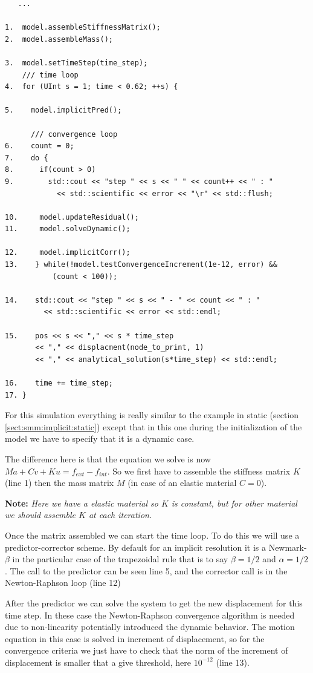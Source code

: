 \documentclass[a4paper,11pt]{book}
\newcommand{\note}[1]{\textbf{Note: }\textit{#1}}
\begin{document}
\begin{verbatim}
   ...

1.  model.assembleStiffnessMatrix();
2.  model.assembleMass();

3.  model.setTimeStep(time_step);
    /// time loop
4.  for (UInt s = 1; time < 0.62; ++s) {

5.    model.implicitPred();

      /// convergence loop
6.    count = 0;
7.    do {
8.      if(count > 0)
9.        std::cout << "step " << s << " " << count++ << " : "
		    << std::scientific << error << "\r" << std::flush;

10.     model.updateResidual();
11.     model.solveDynamic();

12.     model.implicitCorr();
13.    } while(!model.testConvergenceIncrement(1e-12, error) &&
	       (count < 100));

14.    std::cout << "step " << s << " - " << count << " : "
		 << std::scientific << error << std::endl;

15.    pos << s << "," << s * time_step
	   << "," << displacment(node_to_print, 1)
	   << "," << analytical_solution(s*time_step) << std::endl;

16.    time += time_step;
17. }
\end{verbatim}

For  this simulation  everything  is really  similar  to the  example in  static
(section  \ref{sect:smm:implicit:static}) except  that  in this  one during  the
initialization of the model we have to specify that it is a dynamic case.

The difference here is that the equation we solve is now $Ma + Cv + Ku = f_{ext}
- f_{int}$. So we first have to  assemble the stiffness matrix $K$ (line 1) then
the mass matrix $M$ (in case of an elastic material $C = 0$).

\note{Here we have a elastic material so $K$ is constant, but for other material
  we should assemble $K$ at each iteration.}

Once the matrix assembled  we can start the time loop. To do  this we will use a
predictor-corrector  scheme. By  default  for  an implicit  resolution  it is  a
Newmark-$\beta$ in  the particular case of  the trapezoidal rule that  is to say
$\beta = 1/2$ and $\alpha = 1/2$.  The call to the predictor can be seen line 5,
and the corrector call is in the Newton-Raphson loop (line 12)

After the predictor we can solve the system to get the new displacement for this
time step. In these case  the Newton-Raphson convergence algorithm is needed due
to  non-linearity  potentially  introduced  the  dynamic  behavior.  The  motion
equation  in this  case  is solved  in  increment of  displacement,  so for  the
convergence criteria  we just have  to check that  the norm of the  increment of
displacement is smaller that a give threshold, here $10^{-12}$ (line 13).
\end{document}
